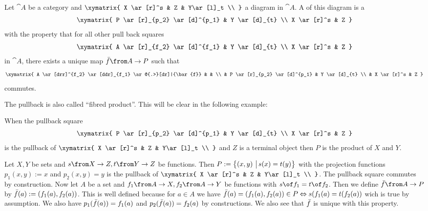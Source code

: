 \begin{definition}[Pullback]
  \label{def:pullback}
  Let $\cat{A}$ be a category and
  $ \xymatrix{
    X \ar[r]^s & Z & Y\ar[l]_t \\
  } $
  a diagram in $\cat{A}$.
  A  of this diagram is a 
  \[ \xymatrix{
    P \ar[r]_{p_2} \ar[d]^{p_1} & Y \ar[d]_{t} \\
    X \ar[r]^s & Z
  } \]
  with the property that for all other pull back squares
  \[ \xymatrix{
    A \ar[r]_{f_2} \ar[d]^{f_1} & Y \ar[d]_{t} \\
    X \ar[r]^s & Z
  } \]
  in $\cat{A}$, there exists a unique map $\bar{f}\from A \to P$ such that
  \[ \xymatrix{
    A \ar[drr]^{f_2} \ar[ddr]_{f_1} \ar@{.>}[dr]|{\bar{f}} & & \\
    & P \ar[r]_{p_2} \ar[d]^{p_1} & Y \ar[d]_{t} \\
    & X \ar[r]^s & Z
  } \]
  commutes.
\end{definition}

The pullback is also called ``fibred product''. This will be clear in the following example:

\begin{example}
  When the pullback square
  \[ \xymatrix{
    P \ar[r]_{p_2} \ar[d]^{p_1} & Y \ar[d]_{t} \\
    X \ar[r]^s & Z
  } \]
  is the pullback of
  $ \xymatrix{
    X \ar[r]^s & Z & Y\ar[l]_t \\
  } $
  and $Z$ is a terminal object then $P$ is the product of $X$ and $Y$.
\end{example}

\begin{example}
  Let $X, Y$ be sets and $s \from X \to Z, t \from Y \to Z$ be functions.
  Then $P := \bigl \{ \left( x , y \right) \,\big|\, s(x) = t(y) \bigr \}$ with the projection functions
  $p_1(x,y) := x$ and $p_2(x, y) = y$ is the pullback of
  $ \xymatrix{
    X \ar[r]^s & Z & Y\ar[l]_t \\
  } $.
  The pullback square commutes by construction.
  Now let $A$ be a set and $f_1 \from A \to X, f_2 \from A \to Y$ be functions with $s \of f_1 = t \of f_2$.
  Then we define $\fbar \from A \to P$ by
  $\bar{f}(a) := \left( f_1(a) , f_2(a) \right)$.
  This is well defined because for $a \in A$ we have $\bar{f}(a) = \left( f_1(a) , f_2(a) \right) \in P \Leftrightarrow s(f_1(a) = t(f_2(a))$ wich is true by assumption.
  We also have $p_1(\bar{f}(a)) = f_1(a)$ and $p_2(\bar{f}(a)) = f_2(a)$ by constructions.
  We also see that $\bar{f}$ is unique with this property.
\end{example}

